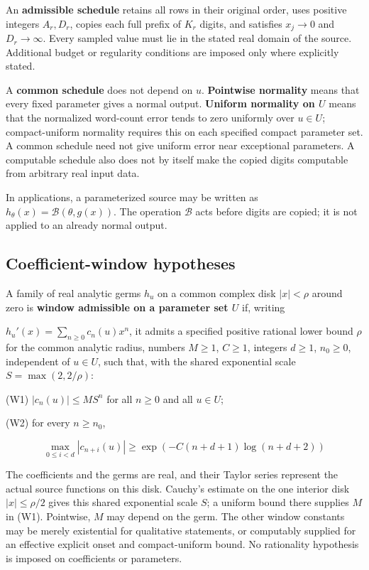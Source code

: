 \documentclass[11pt,a4paper]{article}
\begin{document}
An \textbf{admissible schedule} retains all rows in their original
order, uses positive integers \(A_r,D_r\), copies each full prefix of
\(K_r\) digits, and satisfies \(x_j\to0\) and \(D_r\to\infty\). Every
sampled value must lie in the stated real domain of the source.
Additional budget or regularity conditions are imposed only where
explicitly stated.

A \textbf{common schedule} does not depend on \(u\). \textbf{Pointwise
normality} means that every fixed parameter gives a normal output.
\textbf{Uniform normality on \(U\)} means that the normalized word-count
error tends to zero uniformly over \(u\in U\); compact-uniform normality
requires this on each specified compact parameter set. A common schedule
need not give uniform error near exceptional parameters. A computable
schedule also does not by itself make the copied digits computable from
arbitrary real input data.

In applications, a parameterized source may be written as
\(h_\theta(x)=\mathcal B(\theta,g(x))\). The operation \(\mathcal B\)
acts before digits are copied; it is not applied to an already normal
output.

\subsection{Coefficient-window
hypotheses}\label{coefficient-window-hypotheses}

A family of real analytic germs \(h_u\) on a common complex disk
\(|x|< \rho\) around zero is \textbf{window admissible on a parameter
set \(U\)} if, writing

\(h_u'(x)=\sum_{n\ge 0} c_n(u) x^n\), it admits a specified positive
rational lower bound \(\rho\) for the common analytic radius, numbers
\(M\ge 1\), \(C\ge 1\), integers \(d\ge 1\), \(n_0\ge 0\), independent
of \(u \in U\), such that, with the shared exponential scale
\(S=\max(2,2/\rho)\):

(W1) \(|c_n(u)| \le  M S^n\) for all \(n\ge 0\) and all \(u \in U\);

(W2) for every \(n\ge n_0\),

\[
\max_{0\le i< d} |c_{n+i}(u)| \ge  \exp(-C(n+d+1) \log(n+d+2))
\]

The coefficients and the germs are real, and their Taylor series
represent the actual source functions on this disk. Cauchy's estimate on
the one interior disk \(|x|\le \rho/2\) gives this shared exponential
scale \(S\); a uniform bound there supplies \(M\) in (W1). Pointwise,
\(M\) may depend on the germ. The other window constants may be merely
existential for qualitative statements, or computably supplied for an
effective explicit onset and compact-uniform bound. No rationality
hypothesis is imposed on coefficients or parameters.
\end{document}
